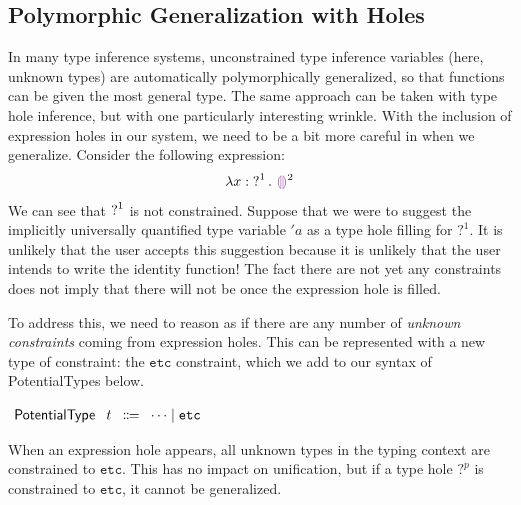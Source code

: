 \subsection{Polymorphic Generalization with Holes}
\label{sec:polymorphicGlobal}
In many type inference systems, unconstrained type inference variables (here, unknown types) are automatically polymorphically generalized, so that
functions can be given the most general type. The same approach can be taken with type hole inference, but with one particularly interesting wrinkle. With the inclusion of expression holes in our system, we need to be a bit more careful in when we generalize. Consider the following expression:
$$\ECLam{x}{\TUnknown^1}{\EEHole^2}$$
We can see that $\operatorname{?}^1$ is not constrained. Suppose that we were to suggest the implicitly universally quantified type variable $'a$ as a type hole filling for $?^1$. It is unlikely that the user accepts this suggestion because it is unlikely that the user intends to write the identity function!
The fact there are not yet any constraints does not imply that there will not be once the expression hole is filled.

To address this, we need to reason as if there are any number of \emph{unknown constraints} coming from expression holes.  This can be represented with a new type of constraint: the $\mathtt{etc}$ constraint, which we add to our syntax of \textsf{PotentialType}s below. 
\begin{center}
$\arraycolsep=4pt\begin{array}{rrcl}
  \textsf{PotentialType} & t & \Coloneqq & \dots \mid \mathtt{etc}
\end{array}$
\end{center}
When an expression hole appears, all unknown types in the typing context are constrained to $\mathtt{etc}$. This has no impact on unification, but if a type hole $?^p$ is constrained to $\mathtt{etc}$, it cannot be generalized. 

